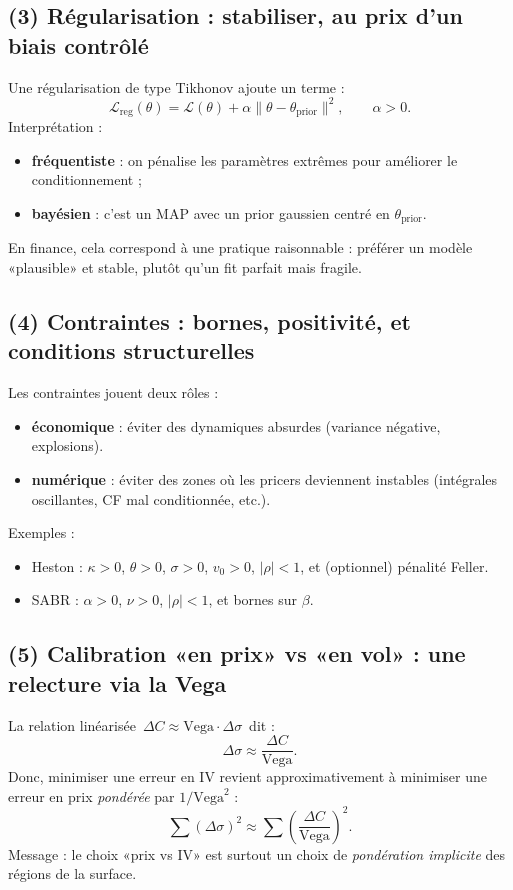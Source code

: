 \subsection*{(3) Régularisation : stabiliser, au prix d'un biais contrôlé}
Une régularisation de type Tikhonov ajoute un terme :
\[
\mathcal{L}_{\mathrm{reg}}(\theta)=\mathcal{L}(\theta)+\alpha\|\theta-\theta_{\mathrm{prior}}\|^2,
\qquad \alpha>0.
\]
Interprétation :
\begin{itemize}[leftmargin=*]
\item \textbf{fréquentiste} : on pénalise les paramètres extrêmes pour améliorer le conditionnement ;
\item \textbf{bayésien} : c'est un MAP avec un prior gaussien centré en $\theta_{\mathrm{prior}}$.
\end{itemize}
En finance, cela correspond à une pratique raisonnable : préférer un modèle «plausible» et stable, plutôt qu'un fit parfait mais fragile.

\subsection*{(4) Contraintes : bornes, positivité, et conditions structurelles}
Les contraintes jouent deux rôles :
\begin{itemize}[leftmargin=*]
\item \textbf{économique} : éviter des dynamiques absurdes (variance négative, explosions).
\item \textbf{numérique} : éviter des zones où les pricers deviennent instables (intégrales oscillantes, CF mal conditionnée, etc.).
\end{itemize}
Exemples :
\begin{itemize}[leftmargin=*]
\item Heston : $\kappa>0$, $\theta>0$, $\sigma>0$, $v_0>0$, $|\rho|<1$, et (optionnel) pénalité Feller.
\item SABR : $\alpha>0$, $\nu>0$, $|\rho|<1$, et bornes sur $\beta$.
\end{itemize}

\subsection*{(5) Calibration «en prix» vs «en vol» : une relecture via la Vega}
La relation linéarisée $\,\Delta C\approx \mathrm{Vega}\cdot \Delta\sigma\,$ dit :
\[
\Delta\sigma \approx \frac{\Delta C}{\mathrm{Vega}}.
\]
Donc, minimiser une erreur en IV revient approximativement à minimiser une erreur en prix \emph{pondérée} par $1/\mathrm{Vega}^2$ :
\[
\sum (\Delta\sigma)^2 \approx \sum \left(\frac{\Delta C}{\mathrm{Vega}}\right)^2.
\]
Message : le choix «prix vs IV» est surtout un choix de \emph{pondération implicite} des régions de la surface.
